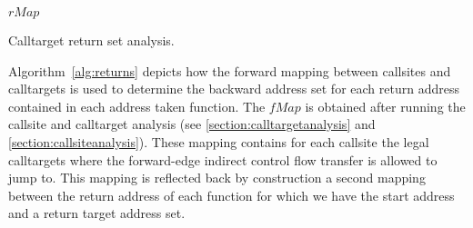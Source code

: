 \begin{algorithm}[!ht]
        \footnotesize
	\SetAlgoLined
        \BlankLine
	{
	
 	
        
        
	\Return $rMap$\;                         

	}
\caption{Calltarget return set analysis.}
\label{alg:returns}
\end{algorithm}

Algorithm~\ref{alg:returns} depicts how the forward mapping between 
callsites and calltargets is used to determine the backward address set 
for each return address contained in each address taken function. The 
$fMap$ is obtained after running the callsite and 
calltarget analysis (see \cref{section:calltargetanalysis} and \cref{section:callsiteanalysis}). 
These mapping contains for each callsite the legal calltargets where the forward-edge
indirect control flow transfer is allowed to jump to. This mapping is reflected back by construction a second
mapping between the return address of each function for which we have the start 
address and a return target address set. 

